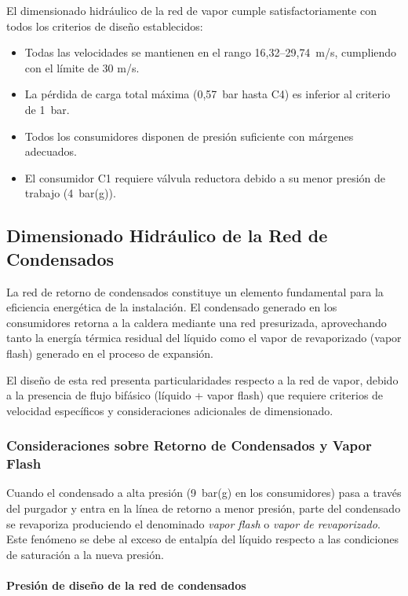 \documentclass[12pt]{article}
\begin{document}
El dimensionado hidráulico de la red de vapor cumple satisfactoriamente con todos los criterios de diseño establecidos:

\begin{itemize}[noitemsep]
	\item Todas las velocidades se mantienen en el rango 16{,}32--29{,}74~m/s, cumpliendo con el límite de 30 m/s.
	\item La pérdida de carga total máxima (0{,}57~bar hasta C4) es inferior al criterio de 1~bar.
	\item Todos los consumidores disponen de presión suficiente con márgenes adecuados.
	\item El consumidor C1 requiere válvula reductora debido a su menor presión de trabajo (4~bar(g)).
\end{itemize}

\subsection{Dimensionado Hidráulico de la Red de Condensados}
\label{subsec:dimensionado-condensados}

La red de retorno de condensados constituye un elemento fundamental para la eficiencia energética de la instalación. El condensado generado en los consumidores retorna a la caldera mediante una red presurizada, aprovechando tanto la energía térmica residual del líquido como el vapor de revaporizado (vapor flash) generado en el proceso de expansión.

El diseño de esta red presenta particularidades respecto a la red de vapor, debido a la presencia de flujo bifásico (líquido + vapor flash) que requiere criterios de velocidad específicos y consideraciones adicionales de dimensionado.

\subsubsection{Consideraciones sobre Retorno de Condensados y Vapor Flash}
\label{subsubsec:consideraciones-condensados}

Cuando el condensado a alta presión (9~bar(g) en los consumidores) pasa a través del purgador y entra en la línea de retorno a menor presión, parte del condensado se revaporiza produciendo el denominado \textit{vapor flash} o \textit{vapor de revaporizado}. Este fenómeno se debe al exceso de entalpía del líquido respecto a las condiciones de saturación a la nueva presión.

\paragraph{Presión de diseño de la red de condensados}
\end{document}
